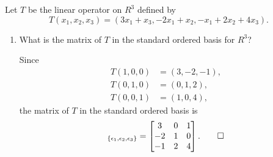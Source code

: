  Let $T$ be the linear operator on $R^3$ defined by
\begin{equation*}
  T(x_1,x_2,x_3)
  = (3x_1 + x_3, -2x_1 + x_2, -x_1 + 2x_2 + 4x_3).
\end{equation*}
\begin{enumerate}
\item What is the matrix of $T$ in the standard ordered basis for
  $R^3$?
  \begin{solution}
    Since
    \begin{align*}
      T(1,0,0) &= (3, -2, -1), \\
      T(0,1,0) &= (0, 1, 2), \\
      T(0,0,1) &= (1, 0, 4),
    \end{align*}
    the matrix of $T$ in the standard ordered basis is
    \begin{equation*}
      [T]_{\{\epsilon_1,\epsilon_2,\epsilon_3\}} =
      \begin{bmatrix}
        3 & 0 & 1 \\
        -2 & 1 & 0 \\
        -1 & 2 & 4
      \end{bmatrix}. \qedhere
    \end{equation*}
  \end{solution}


\end{enumerate}

